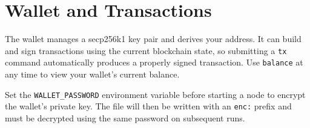\chapter{Wallet and Transactions}
The wallet manages a secp256k1 key pair and derives your address. It can build and sign transactions using the current blockchain state, so submitting a \texttt{tx} command automatically produces a properly signed transaction. Use \texttt{balance} at any time to view your wallet's current balance.

Set the \texttt{WALLET\_PASSWORD} environment variable before starting a node to encrypt the wallet's private key. The file will then be written with an \texttt{enc:} prefix and must be decrypted using the same password on subsequent runs.
